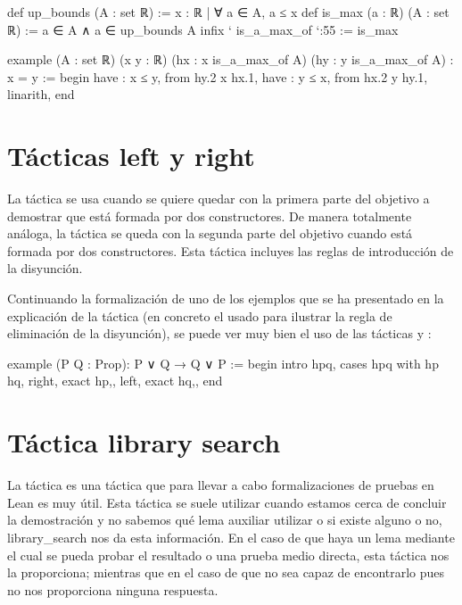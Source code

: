 \begin{leancode}
def up_bounds (A : set ℝ) := { x : ℝ | ∀ a ∈ A, a ≤ x}
def is_max (a : ℝ) (A : set ℝ) := a ∈ A ∧ a ∈ up_bounds A
infix ` is_a_max_of `:55 := is_max

example
  (A : set ℝ)
  (x y : ℝ)
  (hx : x is_a_max_of A)
  (hy : y is_a_max_of A)
  : x = y :=
begin
  have : x ≤ y, from hy.2 x hx.1,
  have : y ≤ x, from hx.2 y hy.1,
  linarith,
end
\end{leancode}

\section{Tácticas left y right}

La táctica  se usa cuando se quiere quedar
con la primera parte del objetivo a demostrar que está formada por dos
constructores.  De manera totalmente análoga, la táctica
 se queda con la segunda parte del
objetivo cuando está formada por dos constructores. Esta táctica
incluyes las reglas de introducción de la disyunción.

Continuando la formalización de uno de los ejemplos que se ha presentado
en la explicación de la táctica  (en concreto el
usado para ilustrar la regla de eliminación de la disyunción), se puede
ver muy bien el uso de las tácticas  y
:
\begin{leancode}
example (P Q : Prop): P ∨ Q → Q ∨ P :=
begin
  intro hpq,
  cases hpq with hp hq,
  { right,
    exact hp,},
  { left,
    exact hq,},
end
\end{leancode}

\section{Táctica library search}

La táctica  es una táctica que
para llevar a cabo formalizaciones de pruebas en Lean es muy útil. Esta
táctica se suele utilizar cuando estamos cerca de concluir la
demostración y no sabemos qué lema auxiliar utilizar o si existe alguno
o no,  {library\_search} nos da esta
información. En el caso de que haya un lema mediante el cual se pueda
probar el resultado o una prueba medio directa, esta táctica nos la
proporciona; mientras que en el caso de que no sea capaz de encontrarlo
pues no nos proporciona ninguna respuesta.

